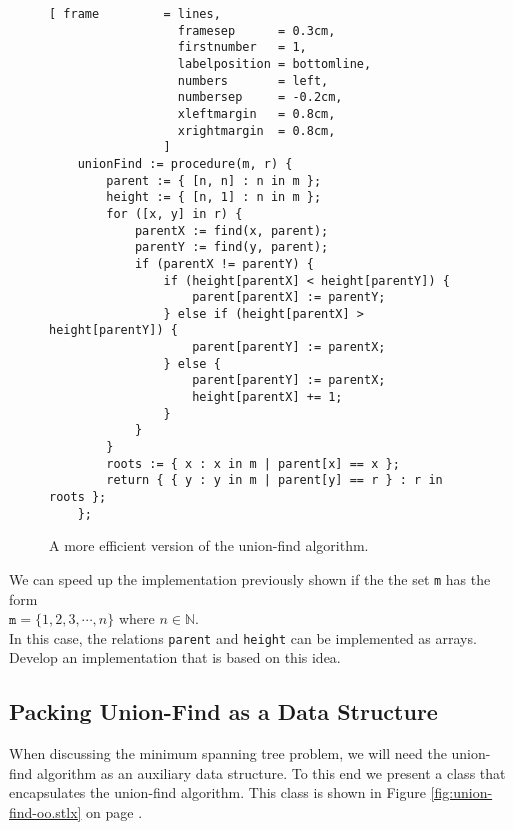 \begin{figure}[!ht]
\centering
\begin{Verbatim}[ frame         = lines, 
                  framesep      = 0.3cm, 
                  firstnumber   = 1,
                  labelposition = bottomline,
                  numbers       = left,
                  numbersep     = -0.2cm,
                  xleftmargin   = 0.8cm,
                  xrightmargin  = 0.8cm,
                ]
    unionFind := procedure(m, r) {
        parent := { [n, n] : n in m };
        height := { [n, 1] : n in m };
        for ([x, y] in r) {
            parentX := find(x, parent);
            parentY := find(y, parent);
            if (parentX != parentY) {
                if (height[parentX] < height[parentY]) {
                    parent[parentX] := parentY;  
                } else if (height[parentX] > height[parentY]) {
                    parent[parentY] := parentX;  
                } else {
                    parent[parentY] := parentX;  
                    height[parentX] += 1;
                }
            }
        }
        roots := { x : x in m | parent[x] == x };
        return { { y : y in m | parent[y] == r } : r in roots };
    };
\end{Verbatim}
\vspace*{-0.3cm}
\caption{A more efficient version of the union-find algorithm.}
\label{fig:union-find.stlx}
\end{figure}

\exercise
We can speed up the implementation previously shown if the the set \texttt{m} has the form
\\[0.2cm]
\hspace*{1.3cm}
$\mathtt{m} = \{ 1, 2, 3, \cdots, n \}$ \quad where $n \in \mathbb{N}$.
\\[0.2cm]
In this case, the relations \texttt{parent} and \texttt{height} can be implemented as arrays.
Develop an implementation that is based on this idea.
\eox

\subsection{Packing Union-Find as a Data Structure}
When discussing  the minimum spanning tree problem,  we will need the union-find algorithm as an
auxiliary data structure.  To this end we present a class that encapsulates the union-find
algorithm.  This class is shown in Figure \ref{fig:union-find-oo.stlx} on page
\pageref{fig:union-find-oo.stlx}.

